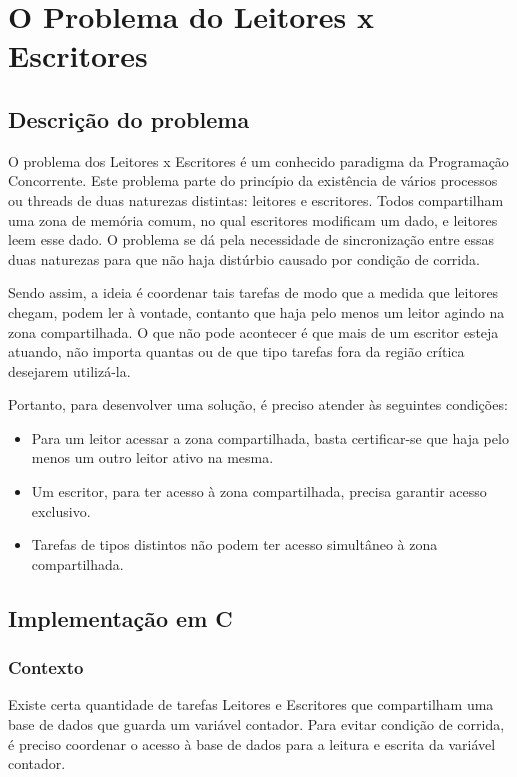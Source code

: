 \documentclass[
	12pt,				%
	openright,			%
	oneside,			%
	a4paper,			%
	chapter=TITLE,		%
	english,			%
	french,				%
	spanish,			%
	brazil				%
	]{abntex2}
\theoremstyle{definition}
\begin{document}
\chapter{O Problema do Leitores x Escritores}

\section{Descrição do problema}
O problema dos Leitores x Escritores é um conhecido paradigma da Programação Concorrente. Este problema parte do princípio da existência de vários processos ou threads de duas naturezas distintas: leitores e escritores. Todos compartilham uma zona de memória comum, no qual escritores modificam um dado, e leitores leem esse dado. O problema se dá pela necessidade de sincronização entre essas duas naturezas para que não haja distúrbio causado por condição de corrida. 

Sendo assim, a ideia é coordenar tais tarefas de modo que a medida que leitores chegam, podem ler à vontade, contanto que haja pelo menos um leitor agindo na zona compartilhada. O que não pode acontecer é que mais de um escritor esteja atuando, não importa quantas ou de que tipo tarefas fora da região crítica desejarem utilizá-la.

Portanto, para desenvolver uma solução, é preciso atender às seguintes condições:

\begin{itemize}
    \item Para um leitor acessar a zona compartilhada, basta certificar-se que haja pelo menos um outro leitor ativo na mesma.
    \item Um escritor, para ter acesso à zona compartilhada, precisa garantir acesso exclusivo.
    \item Tarefas de tipos distintos não podem ter acesso simultâneo à zona compartilhada.
\end{itemize}

\section{Implementação em C}

\subsection{Contexto}

Existe certa quantidade de tarefas Leitores e Escritores que compartilham uma base de dados que guarda um variável contador. Para evitar condição de corrida, é preciso coordenar o acesso à base de dados para a leitura e escrita da variável contador.
\end{document}
